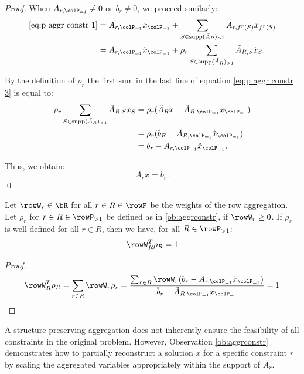 {\begin{proof}
  When \(A_{r, \colP_{=1}} \neq 0\) or \(b_r \neq 0\), we proceed similarly:
  \begin{align}
  \label{eq:p aggr constr 3}
 \eqref{eq:p aggr constr 1} &=A_{r, \colP_{=1}} x_{\colP_{=1}} + \sum_{S \in \supp(\tilde{A}_R)_{>1}} A_{r, f^r(S)} x_{f^r(S)}  \\
  &=  A_{r, \colP_{=1}} \tilde{x}_{\colP_{=1}} + \rho_r \sum_{S \in \supp(\tilde{A}_R)_{>1}} \tilde{A}_{R, S}  \tilde{x}_S.
  \end{align}
  
  By the definition of \(\rho_r\) the first sum in the last line of equation \eqref{eq:p aggr constr 3} is equal to:
  \begin{align*}
  \rho_r \sum_{S \in \supp(\tilde{A}_R)_{>1}} \tilde{A}_{R, S} \tilde{x}_S 
  &= \rho_r (\tilde{A}_R \tilde{x} - \tilde{A}_{R, \colP_{=1}} \tilde{x}_{\colP_{=1}}) \\
  &= \rho_r (\tilde{b}_R - \tilde{A}_{R, \colP_{=1}} \tilde{x}_{\colP_{=1}}) \\
  &= b_r - A_{r, \colP_{=1}} \tilde{x}_{\colP_{=1}}.
  \end{align*}
  
  Thus, we obtain:
  \[
  A_r x = b_r.
  \]
  \qed
  \end{proof}

  


\begin{observation}
  \label{ob:rhoconvex}
  Let \(\rowW_r \in \bR\) for all \(r \in R \in \rowP\) be the weights of the row aggregation.
  Let \(\rho_r\) for \(r \in R \in \rowP_{>1}\) be defined as in \ref{ob:aggrconstr}, if \(\rowW_r \geq 0\). If \(\rho_r\) is well defined for all \(r \in R\), then we have, for all \(R \in \rowP_{>1}\):
  \begin{equation}
    \rowW_R^T \rho_R = 1
  \end{equation}
\end{observation}
\begin{proof}
  \[
  \rowW_R^T \rho_R = \sum_{r \in R} \rowW_r \rho_r =  \frac{\sum_{r \in R}\rowW_r(b_r - A_{r, \colP_{=1}} \tilde{x}_{\colP_{=1}})}{\tilde{b}_r
  - \tilde{A}_{R, \colP_{=1}} \tilde{x}_{\colP_{=1}}} = 1
  \] 
\end{proof}

A structure-preserving aggregation does not inherently ensure the feasibility of all constraints in the original problem. However, Observation \ref{ob:aggrconstr} demonstrates how to partially reconstruct a solution \(x\) for a specific constraint \(r\) by scaling the aggregated variables appropriately within the support of \(A_r\).

}
